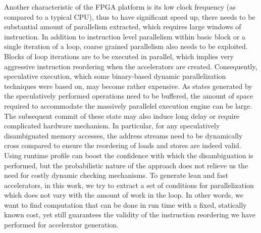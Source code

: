 Another characteristic of the FPGA platform is its low clock frequency
(as compared to a typical CPU), thus to have significant speed up, there
needs to be substantial amount of parallelism extracted, which requires large windows of instruction.
In addition to instruction level parallelism within basic block or a single iteration of a loop, coarse grained parallelism 
also needs to be exploited. Blocks of loop iterations are to be executed in parallel, which implies very aggressive instruction
reordering when the accelerators are created.
%
Consequently, speculative execution, which some binary-based dynamic parallelization techniques were based on, may become rather expensive. As states generated by the speculatively performed operations need to be buffered, 
the amount of space required to accommodate the massively parallelel execution engine
can be large.
The subsequent commit of these state may also induce long delay
or require complicated hardware mechanism.
In particular, for any speculatively disambiguated memory accesses, the address streams need to be dynamically cross compared to ensure the
reordering of loads and stores are indeed valid. 
Using runtime profile can boost the confidence with which the disambiguation
is performed, but the probabilistic nature of the approach does not
relieve us the need for costly dynamic checking mechanisms. To generate
lean and fast accelerators, in this work, we try to extract a set of conditions for parallelization which does not vary with the amount of work
in the loop. In other words, we want to find computation that can 
be done in run time with a fixed, statically known cost, yet still guarantees the validity of the instruction reordering we have performed for accelerator generation. 

